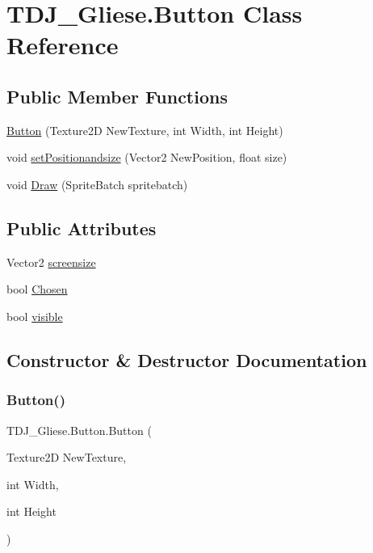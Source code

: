 \hypertarget{class_t_d_j___gliese_1_1_button}{}\section{T\+D\+J\+\_\+\+Gliese.\+Button Class Reference}
\label{class_t_d_j___gliese_1_1_button}
\subsection*{Public Member Functions}
\begin{DoxyCompactItemize}
\item 
\hyperlink{class_t_d_j___gliese_1_1_button_adf5536354677598837eff6c49c7b45aa}{Button} (Texture2D New\+Texture, int Width, int Height)
\item 
void \hyperlink{class_t_d_j___gliese_1_1_button_a882b31c253a94cf518f1666678a8612d}{set\+Positionandsize} (Vector2 New\+Position, float size)
\item 
void \hyperlink{class_t_d_j___gliese_1_1_button_ab30ca7bbccb8accc8657ebeb25d698c0}{Draw} (Sprite\+Batch spritebatch)
\end{DoxyCompactItemize}
\subsection*{Public Attributes}
\begin{DoxyCompactItemize}
\item 
Vector2 \hyperlink{class_t_d_j___gliese_1_1_button_a242782e04e1ff2bbce3b123999c433e1}{screensize}
\item 
bool \hyperlink{class_t_d_j___gliese_1_1_button_a8af39320456a83a5ed7843fed72c7c99}{Chosen}
\item 
bool \hyperlink{class_t_d_j___gliese_1_1_button_af2849bf689f6828d75ed73feba9d6819}{visible}
\end{DoxyCompactItemize}


\subsection{Constructor \& Destructor Documentation}
\mbox{\label{class_t_d_j___gliese_1_1_button_adf5536354677598837eff6c49c7b45aa}} 
\subsubsection{\texorpdfstring{Button()}{Button()}}
{\footnotesize\ttfamily T\+D\+J\+\_\+\+Gliese.\+Button.\+Button (\begin{DoxyParamCaption}\item[{Texture2D}]{New\+Texture,  }\item[{int}]{Width,  }\item[{int}]{Height }\end{DoxyParamCaption})}



